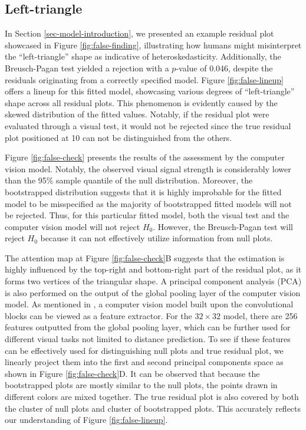 \documentclass[]{interact}
\theoremstyle{plain}%
\theoremstyle{definition}
\theoremstyle{remark}
\begin{document}
\subsection{Left-triangle}\label{left-triangle}

In Section \ref{sec-model-introduction}, we presented an example
residual plot showcased in Figure \ref{fig:false-finding}, illustrating
how humans might misinterpret the ``left-triangle'' shape as indicative
of heteroskedasticity. Additionally, the Breusch-Pagan test yielded a
rejection with a \(p\)-value of 0.046, despite the residuals originating
from a correctly specified model. Figure \ref{fig:false-lineup} offers a
lineup for this fitted model, showcasing various degrees of
``left-triangle'' shape across all residual plots. This phenomenon is
evidently caused by the skewed distribution of the fitted values.
Notably, if the residual plot were evaluated through a visual test, it
would not be rejected since the true residual plot positioned at 10 can
not be distinguished from the others.

Figure \ref{fig:false-check} presents the results of the assessment by
the computer vision model. Notably, the observed visual signal strength
is considerably lower than the 95\% sample quantile of the null
distribution. Moreover, the bootstrapped distribution suggests that it
is highly improbable for the fitted model to be misspecified as the
majority of bootstrapped fitted models will not be rejected. Thus, for
this particular fitted model, both the visual test and the computer
vision model will not reject \(H_0\). However, the Breusch-Pagan test
will reject \(H_0\) because it can not effectively utilize information
from null plots.

The attention map at Figure \ref{fig:false-check}B suggests that the
estimation is highly influenced by the top-right and bottom-right part
of the residual plot, as it forms two vertices of the triangular shape.
A principal component analysis (PCA) is also performed on the output of
the global pooling layer of the computer vision model. As mentioned in
\citet{simonyan2014very}, a computer vision model built upon the
convolutional blocks can be viewed as a feature extractor. For the
\(32 \times 32\) model, there are 256 features outputted from the global
pooling layer, which can be further used for different visual tasks not
limited to distance prediction. To see if these features can be
effectively used for distinguishing null plots and true residual plot,
we linearly project them into the first and second principal components
space as shown in Figure \ref{fig:false-check}D. It can be observed that
because the bootstrapped plots are mostly similar to the null plots, the
points drawn in different colors are mixed together. The true residual
plot is also covered by both the cluster of null plots and cluster of
bootstrapped plots. This accurately reflects our understanding of Figure
\ref{fig:false-lineup}.
\end{document}
